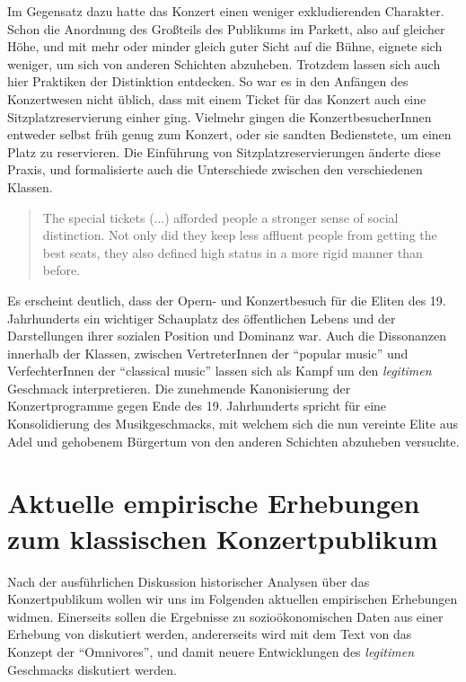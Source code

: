 \documentclass[a4paper, german, oneside]{scrbook}
\begin{document}
Im Gegensatz dazu hatte das Konzert einen weniger exkludierenden Charakter. Schon die Anordnung des Großteils des Publikums im Parkett, also auf gleicher Höhe, und mit mehr oder minder gleich guter Sicht auf die Bühne, eignete sich weniger, um sich von anderen Schichten abzuheben. Trotzdem lassen sich auch hier Praktiken der Distinktion entdecken. So war es in den Anfängen des Konzertwesen nicht üblich, dass mit einem Ticket für das Konzert auch eine Sitzplatzreservierung einher ging. Vielmehr gingen die KonzertbesucherInnen entweder selbst früh genug zum Konzert, oder sie sandten Bedienstete, um einen Platz zu reservieren. Die Einführung von Sitzplatzreservierungen änderte diese Praxis, und formalisierte auch die Unterschiede zwischen den verschiedenen Klassen. \parencite[vgl.][30]{weber_music_2004}

\blockquote[{\cite[30]{weber_music_2004}}]{The special tickets (...) afforded people a stronger sense of social distinction.  Not only did they keep less affluent people from getting the best seats, they also defined high status in a more rigid manner than before.}

Es erscheint deutlich, dass der Opern- und Konzertbesuch für die Eliten des 19. Jahrhunderts ein wichtiger Schauplatz des öffentlichen Lebens und der Darstellungen ihrer sozialen Position und Dominanz war. Auch die Dissonanzen innerhalb der Klassen, zwischen VertreterInnen der \enquote{popular music} und VerfechterInnen der \enquote{classical music} lassen sich als Kampf um den \emph{legitimen} Geschmack interpretieren. Die zunehmende Kanonisierung der Konzertprogramme gegen Ende des 19. Jahrhunderts spricht für eine Konsolidierung des Musikgeschmacks, mit welchem sich die nun vereinte Elite aus Adel und gehobenem Bürgertum von den anderen Schichten abzuheben versuchte. \parencite[vgl.][127]{muller_publikum_2014}





\chapter{Aktuelle empirische Erhebungen zum klassischen Konzertpublikum}
Nach der ausführlichen Diskussion historischer Analysen über das Konzertpublikum wollen wir uns im Folgenden aktuellen empirischen Erhebungen widmen. Einerseits sollen die Ergebnisse zu sozioökonomischen Daten aus einer Erhebung von \textcite{de_la_motte-haber_konzertpublika_2007} diskutiert werden, andererseits wird mit dem Text von \textcite{gebesmair_grundzuge_2001} das Konzept der \enquote{Omnivores}, und damit neuere Entwicklungen des \emph{legitimen} Geschmacks diskutiert werden.
\end{document}
